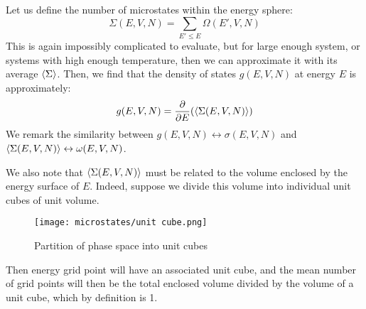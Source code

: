 \documentclass[a4paper,11pt,oneside]{book}
\begin{document}
Let us define the number of microstates within the energy sphere:
\begin{equation}
    \Sigma (E,V,N) = \sum_{E'\leq E} \Omega(E',V,N)
\end{equation}
This is again impossibly complicated to evaluate, but for large enough system, or systems with high enough temperature, then we can approximate it with its average $\braket{\Sigma}$. Then, we find that the density of states $g(E,V,N)$ at energy $E$ is approximately:
\begin{equation}
    g(E,V,N) = \frac{\partial}{\partial E}(\braket{\Sigma(E,V,N)})
\end{equation}
We remark the similarity between $g(E,V,N) \leftrightarrow \sigma(E,V,N)$ and $\braket{\Sigma(E,V,N)} \leftrightarrow \omega(E,V,N)$.


We also note that $\braket{\Sigma(E,V,N)}$ must be related to the volume enclosed by the energy surface of $E$. Indeed, suppose we divide this volume into individual unit cubes of unit volume. 
\begin{figure}[h!]
    \centering
    \texttt{[image: microstates/unit cube.png]}
    \caption{Partition of phase space into unit cubes}
    \label{fig:my_label}
\end{figure}

Then energy grid point will have an associated unit cube, and the mean number of grid points will then be the total enclosed volume divided by the volume of a unit cube, which by definition is 1.
\end{document}
